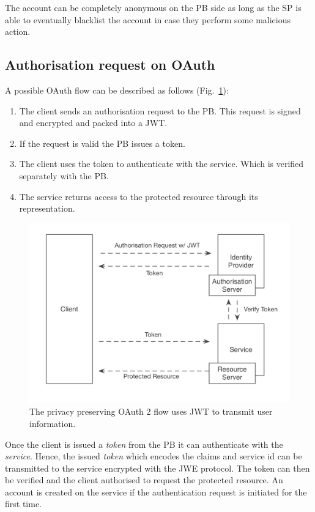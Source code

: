 The account can be completely anonymous on the PB side as long as the SP is able to eventually blacklist the account in case they perform some malicious action.

\subsection{Authorisation request on OAuth}

A possible OAuth flow can be described as follows (Fig.~\ref{fig:privateflow}):
\begin{enumerate}
    \item The client sends an authorisation request to the PB. This request is signed and encrypted and packed into a JWT.
    \item If the request is valid the PB issues a token.
    \item The client uses the token to authenticate with the service. Which is verified separately with the PB.
    \item The service returns access to the protected resource through its representation.
\end{enumerate}

\begin{figure}
\includegraphics[width=\textwidth]{figures/PrivateFlow.png}
\caption[Privacy Preserving OAuth Flow with JWT.]{The privacy preserving OAuth 2 flow uses JWT to transmit user information.
\label{fig:privateflow}}
\end{figure}

Once the client is issued a \emph{token} from the PB it can authenticate with the \emph{service}. Hence, the issued \emph{token} which encodes the claims and service id can be transmitted to the service encrypted with the JWE protocol. The token can then be verified and the client authorised to request the protected resource. An account is created on the service if the authentication request is initiated for the first time.


